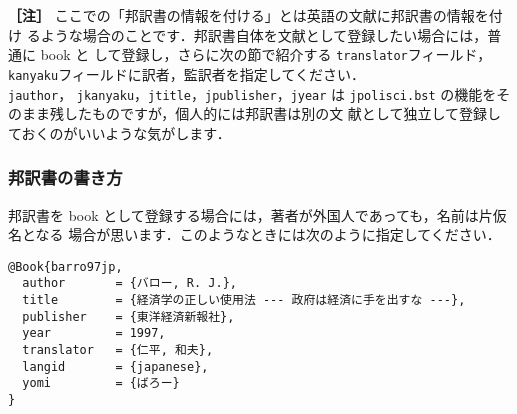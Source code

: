 \documentclass[article]{jlreq}
\newcommand{\midashii}[1]{\noindent \textbf{［#1］}}
\begin{document}
\midashii{注} ここでの「邦訳書の情報を付ける」とは英語の文献に邦訳書の情報を付け
るような場合のことです．邦訳書自体を文献として登録したい場合には，普通に book と
して登録し，さらに次の節で紹介する \texttt{translator}フィールド，
\texttt{kanyaku}フィールドに訳者，監訳者を指定してください．\\ \texttt{jauthor}，
\texttt{jkanyaku}，\texttt{jtitle}，\texttt{jpublisher}，\texttt{jyear} は
\texttt{jpolisci.bst} の機能をそのまま残したものですが，個人的には邦訳書は別の文
献として独立して登録しておくのがいいような気がします．

\subsubsection{邦訳書の書き方}
\label{sec:hoyakusho}

邦訳書を book として登録する場合には，著者が外国人であっても，名前は片仮名となる
場合が思います．このようなときには次のように指定してください．\\

\begin{screen}
 \begin{verbatim}
@Book{barro97jp,
  author       = {バロー, R. J.},
  title        = {経済学の正しい使用法 --- 政府は経済に手を出すな ---},
  publisher    = {東洋経済新報社},
  year         = 1997,
  translator   = {仁平, 和夫},
  langid       = {japanese},
  yomi         = {ばろー}
}
 \end{verbatim}
\end{screen}
\vspace*{1em}
\end{document}
